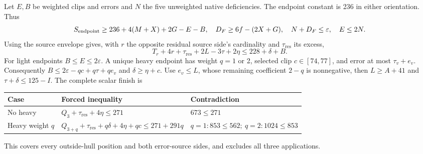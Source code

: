\documentclass[11pt,letterpaper]{article}
\theoremstyle{definition}\newtheorem{definition}[theorem]{Definition}
\begin{document}
Let $E,B$ be weighted clips and errors and $N$ the five unweighted native deficiencies. The endpoint constant is 236 in either orientation. Thus
\[
 S_{\rm endpoint}\ge236+4(M+X)+2G-E-B,
 \quad D_F\ge6f-(2X+G),\quad N+D_F\le\varepsilon,
 \quad E\le2N.
\]
Using the source envelope gives, with $r$ the opposite residual source side's cardinality and $\tau_{\mathrm{res}}$ its excess,
\begin{equation}\label{eq:z4Fmaster}
 T_r+4r+\tau_{\mathrm{res}}+2L-3\tau+2\eta\le228+\delta+B.
\end{equation}
For light endpoints $B\le E\le2\varepsilon$. A unique heavy endpoint has weight $q=1$ or 2, selected clip $c\in[74,77]$, and error at most $\tau_v+e_v$. Consequently
$B\le2\varepsilon-qc+q\tau+qe_v$ and $\delta\ge\eta+c$.
Use $e_v\le L$, whose remaining coefficient $2-q$ is nonnegative, then $L\ge A+41$ and $\tau+\delta\le125-I$. The complete scalar finish is
\begin{center}\small
\begin{tabular}{lll}
Case&Forced inequality&Contradiction\\\hline
No heavy&$Q_3+\tau_{\mathrm{res}}+4\eta\le271$&$673\le271$\\
Heavy weight $q$&$Q_{3+q}+\tau_{\mathrm{res}}+q\delta+4\eta+qc\le271+291q$&\(q=1:853\le562;\ q=2:1024\le853\)
\end{tabular}
\end{center}
This covers every outside-hull position and both error-source sides, and excludes all three applications.
\end{document}
